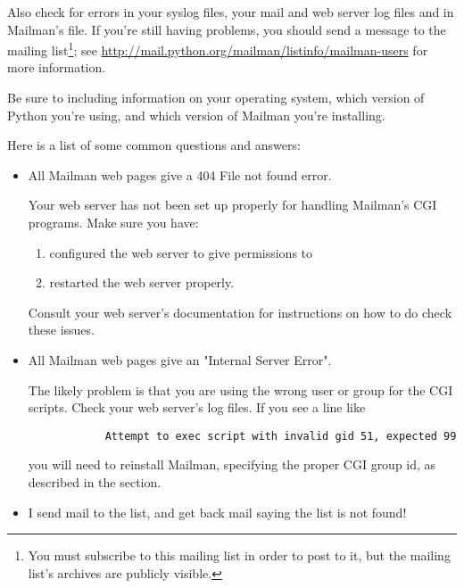 \documentclass{howto}
\begin{document}
Also check for errors in your syslog files, your mail and web server log files
and in Mailman's  file.  If you're still
having problems, you should send a message to the
 mailing list\footnote{You must subscribe to
this mailing list in order to post to it, but the mailing list's archives are
publicly visible.}; see
\url{http://mail.python.org/mailman/listinfo/mailman-users} for more
information.

Be sure to including information on your operating system, which version of
Python you're using, and which version of Mailman you're installing.

Here is a list of some common questions and answers:

\begin{itemize}

\item {} All Mailman web pages give a 404 File not found
      error.

       Your web server has not been set up properly for
      handling Mailman's CGI programs.  Make sure you have:

      \begin{enumerate}
      \item configured the web server to give permissions to

      \item restarted the web server properly.
      \end{enumerate}

      Consult your web server's documentation for instructions on how to do
      check these issues.

\item {} All Mailman web pages give an "Internal Server
      Error".

       The likely problem is that you are using the wrong
      user or group for the CGI scripts.  Check your web server's log files.
      If you see a line like

      \begin{verbatim}
            Attempt to exec script with invalid gid 51, expected 99
      \end{verbatim}

      you will need to reinstall Mailman, specifying the proper CGI group id,
      as described in the \label{building} section.

\item {} I send mail to the list, and get back mail saying the
       list is not found!


\end{itemize}
\end{document}
